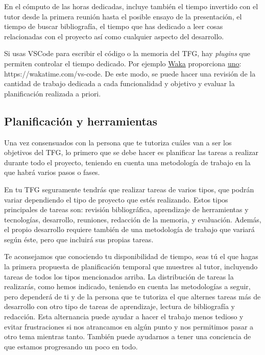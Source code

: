 En el cómputo de las horas dedicadas, incluye también el tiempo invertido con el tutor desde la primera reunión hasta el posible ensayo de la presentación, el tiempo de buscar bibliografía, el tiempo que has dedicado a leer cosas relacionadas con el proyecto así como cualquier aspecto del desarrollo.

Si usas VSCode para escribir el código o la memoria del TFG, hay {\it plugins} que permiten controlar el tiempo dedicado. Por ejemplo \href{https://wakatime.com/}{Waka} proporciona \href{https://grados.ugr.es/informatica/pages/infoacademica/tfggestion2}{uno}: {https://wakatime.com/vs-code}. De este modo, se puede hacer una revisión de la cantidad de trabajo dedicada a cada funcionalidad y objetivo y evaluar la planificación realizada a priori.




\subsection{Planificación y herramientas} %
Una vez consensuados con la persona que te tutoriza cuáles van a ser los objetivos del TFG, lo primero que se debe hacer es planificar las tareas a realizar durante todo el proyecto, teniendo en cuenta una metodología de trabajo en la que habrá varios pasos o fases.

En tu TFG seguramente tendrás que realizar tareas de varios tipos, que podrán variar dependiendo el tipo de proyecto que estés realizando. Estos tipos principales de tareas son: revisión bibliográfica, aprendizaje de herramientas y tecnologías, desarrollo, reuniones, redacción de la memoria, y evaluación. Además, el propio desarrollo requiere también de una metodología de trabajo que variará según éste, pero que incluirá sus propias tareas.

Te aconsejamos que conociendo tu disponibilidad de tiempo, seas tú el que hagas la primera propuesta de planificación temporal que muestres al tutor, incluyendo tareas de todos los tipos mencionados arriba. La distribución de tareas la realizarás, como hemos indicado, teniendo en cuenta las metodologías a seguir, pero dependerá de ti y de la persona que te tutoriza el que alternes tareas más de desarrollo con otro tipo de tareas de aprendizaje, lectura de bibliografía y redacción. Esta alternancia puede ayudar a hacer el trabajo menos tedioso y evitar frustraciones si nos atrancamos en algún punto y nos permitimos pasar a otro tema mientras tanto. También puede ayudarnos a tener una conciencia de que estamos progresando un poco en todo. 

